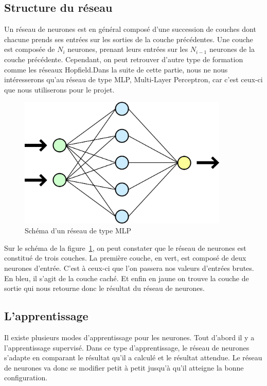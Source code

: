 \documentclass[11pt]{report}
\begin{document}
\subsection{Structure du réseau}

Un réseau de neurones est en général composé d'une succession de couches dont chacune prends ses entrées sur les sorties de la couche précédentes. Une couche est composée de $N_{i}$ neurones, prenant leurs entrées sur les $N_{i-1}$ neurones de la couche précédente. Cependant, on peut retrouver d'autre type de formation comme les réseaux Hopfield.Dans la suite de cette partie, nous ne nous intéresserons qu'au réseau de type MLP, Multi-Layer Perceptron, car c'est ceux-ci que nous utiliserons pour le projet.

\begin{figure}[htbp]
\centering
\includegraphics[width=10cm]{mlp.png}
\caption{Schéma d'un réseau de type MLP}
\label{MLP}
\end{figure}

Sur le schéma de la figure~\ref{MLP}, on peut constater que le réseau de neurones est constitué de trois couches. La première couche, en vert, est composé de deux neurones d'entrée. C'est à ceux-ci que l'on passera nos valeurs d'entrées brutes. En bleu, il s'agit de la couche caché. Et enfin en jaune on trouve la couche de sortie qui nous retourne donc le résultat du réseau de neurones.

\subsection{L'apprentissage}

Il existe plusieurs modes d'apprentissage pour les neurones. Tout d'abord il y a l'apprentissage supervisé. Dans ce type d'apprentissage, le réseau de neurones s'adapte en comparant le résultat qu'il a calculé et le résultat attendue. Le réseau de neurones va donc se modifier petit à petit jusqu'à qu'il atteigne la bonne configuration.
\end{document}

